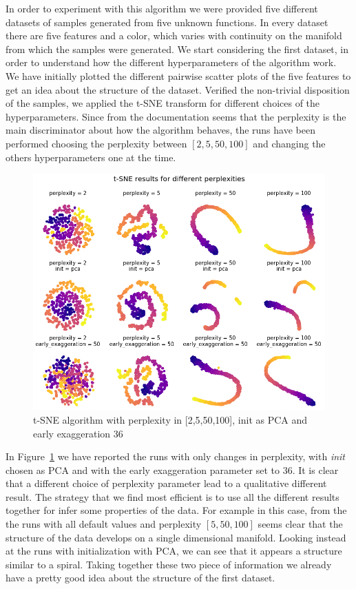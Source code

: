 \documentclass[%
 aip,
 jmp,%
 amsmath,amssymb,
 reprint,%
]{revtex4-1}
\begin{document}
In order to experiment with this algorithm we were provided five different
datasets of samples generated from five unknown functions.
In every dataset there are five features and a color, which varies with
continuity on the manifold from which the samples were generated.
We start considering the first dataset, in order to understand how the
different hyperparameters of the algorithm work.
We have initially plotted the different pairwise scatter plots of the
five features to get an idea about the structure of the dataset.
Verified the non-trivial disposition of the samples, we applied the t-SNE
transform for different choices of the hyperparameters.
Since from the documentation seems that the perplexity is the main
discriminator about how the algorithm behaves, the runs have been
performed choosing the perplexity between $[2, 5, 50, 100]$ and changing
the others hyperparameters one at the time.

\begin{figure}[h]
 \includegraphics[scale=0.26]{images/t-SNE.png}
 \caption{t-SNE algorithm with perplexity in [2,5,50,100], init as PCA and early exaggeration 36}
 \label{fig:tsne}
\end{figure}

In Figure~\ref{fig:tsne} we have reported the runs with only changes in
perplexity, with \textit{init} chosen as PCA and with the early exaggeration
parameter set to $36$. It is clear that a different choice of perplexity
parameter lead to a qualitative different result. The strategy that
we find most efficient is to use all the different results together for
infer some properties of the data. For example in this case, from the
the runs with all default values and perplexity $[5, 50, 100]$ seems
clear that the structure of the data develops on a single dimensional
manifold. Looking instead at the runs with initialization with PCA, we
can see that it appears a structure similar to a spiral. Taking together
these two piece of information we already have a pretty good idea about
the structure of the first dataset.
\end{document}
